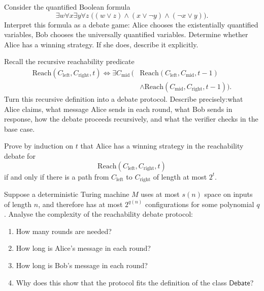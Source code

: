 \documentclass[11pt]{article}
\begin{document}
\begin{exercise}
\label{ex:ex3}
Consider the quantified Boolean formula
\[
\exists w \forall x \exists y \forall z \; \bigl((w \lor z)\land (x \lor \neg y)\land (\neg x \lor y)\bigr).
\]
Interpret this formula as a debate game: Alice chooses the existentially quantified variables, Bob chooses the universally quantified variables. Determine whether Alice has a winning strategy. If she does, describe it explicitly.
\end{exercise}

\begin{exercise}
\label{ex:ex4}
Recall the recursive reachability predicate
\[
\begin{aligned}
\mathrm{Reach}(C_{\mathrm{left}},C_{\mathrm{right}},t)
\iff
\exists C_{\mathrm{mid}}\,
\bigl(
&\mathrm{Reach}(C_{\mathrm{left}},C_{\mathrm{mid}},t-1) \\
&\land
\mathrm{Reach}(C_{\mathrm{mid}},C_{\mathrm{right}},t-1)
\bigr).
\end{aligned}
\]
Turn this recursive definition into a debate protocol. Describe precisely:what Alice claims, what message Alice sends in each round, what Bob sends in response, how the debate proceeds recursively, and what the verifier checks in the base case.
\end{exercise}

\begin{exercise}
\label{ex:ex5}
Prove by induction on \(t\) that Alice has a winning strategy in the reachability debate for
\[
\mathrm{Reach}(C_{\mathrm{left}},C_{\mathrm{right}},t)
\]
if and only if there is a path from \(C_{\mathrm{left}}\) to \(C_{\mathrm{right}}\) of length at most \(2^t\).
\end{exercise}

\begin{exercise}
\label{ex:ex6}
Suppose a deterministic Turing machine \(M\) uses at most \(s(n)\) space on inputs of length \(n\), and therefore has at most \(2^{q(n)}\) configurations for some polynomial \(q\). Analyse the complexity of the reachability debate protocol:
\begin{enumerate}
    \item How many rounds are needed?
    \item How long is Alice's message in each round?
    \item How long is Bob's message in each round?
    \item Why does this show that the protocol fits the definition of the class \(\mathsf{Debate}\)?
\end{enumerate}
\end{exercise}
\end{document}

